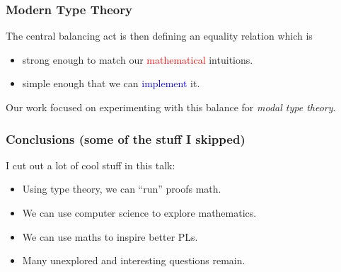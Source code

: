 \documentclass[usenames,dvipsnames,aspectratio=169,12pt]{beamer}
\begin{document}
\begin{frame}
  \frametitle{Modern Type Theory}
  The central balancing act is then defining an equality relation which is
  \begin{itemize}
  \item strong enough to match our \textcolor{Red}{mathematical} intuitions.
  \item simple enough that we can \textcolor{Blue}{implement} it.
  \end{itemize}
  \bigskip

  Our work focused on experimenting with this balance for \emph{modal type theory}.
\end{frame}



\begin{frame}
  \frametitle{Conclusions (some of the stuff I skipped)}
  I cut out a lot of cool stuff in this talk:
  \begin{itemize}
  \item Using type theory, we can ``run'' proofs math.
  \item We can use computer science to explore mathematics.
  \item We can use maths to inspire better PLs.
  \item Many unexplored and interesting questions remain.
  \end{itemize}
\end{frame}
\end{document}
